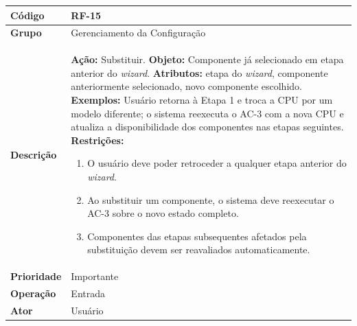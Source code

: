 \FloatBarrier
\begin{quadro}[htb]
  \caption{RF-15 -- Substituir componente selecionado em etapa anterior}
  \label{quad:rf15}
  \begin{tabular}{|p{3.2cm}|p{11.8cm}|}
    \hline
    \textbf{Código}     & RF-15                                                                                  \\ \hline
    \textbf{Grupo}      & Gerenciamento da Configuração                                                          \\ \hline
    \textbf{Descrição}  &
    \textbf{Ação:} Substituir.
    \textbf{Objeto:} Componente já selecionado em etapa anterior do \textit{wizard}.
    \textbf{Atributos:} etapa do \textit{wizard}, componente anteriormente selecionado, novo componente escolhido.
    \textbf{Exemplos:} Usuário retorna à Etapa 1 e troca a CPU por um modelo diferente; o sistema reexecuta o AC-3 com a nova CPU e atualiza a disponibilidade dos componentes nas etapas seguintes.
    \textbf{Restrições:}
    \begin{enumerate}[nosep,leftmargin=1.2em,topsep=2pt,partopsep=0pt,parsep=0pt,itemsep=1pt]
      \item O usuário deve poder retroceder a qualquer etapa anterior do \textit{wizard}.
      \item Ao substituir um componente, o sistema deve reexecutar o AC-3 sobre o novo estado completo.
      \item Componentes das etapas subsequentes afetados pela substituição devem ser reavaliados automaticamente.
    \end{enumerate} \\ \hline
    \textbf{Prioridade} & Importante                                                                             \\ \hline
    \textbf{Operação}   & Entrada                                                                                \\ \hline
    \textbf{Ator}       & Usuário                                                                                \\ \hline
  \end{tabular}
\end{quadro}


